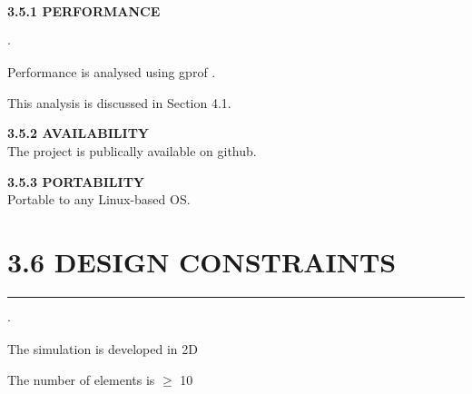 \documentclass{report}
\begin{document}
\large \textbf{3.5.1 PERFORMANCE}
\begin{list}{$\cdot$}{\setlength{\leftmargin}{0em}}
\item Performance is analysed using gprof \cite{gprof}.
\item This analysis is discussed in Section 4.1. 
\end{list}

\large \textbf{3.5.2 AVAILABILITY}\\
The project is publically available on github.

\large \textbf{3.5.3 PORTABILITY}\\
Portable to any Linux-based OS.

\section*{3.6 DESIGN CONSTRAINTS}
\hrule \large
\begin{list}{$\cdot$}{\setlength{\leftmargin}{0em}}
\item The simulation is developed in 2D
\item The number of elements is $\geq$ 10
\end{list}
\end{document}
